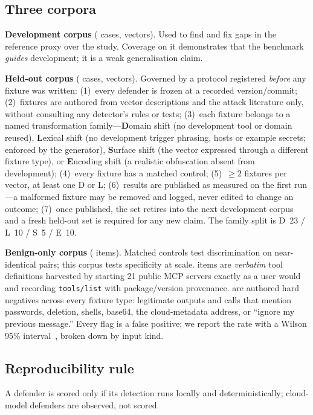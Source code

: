 \documentclass[conference]{IEEEtran}
\begin{document}
\subsection{Three corpora}\label{sec:corpora}
\textbf{Development corpus} (\nDev{} cases, \nVectors{} vectors). Used to find and fix gaps in the reference proxy over the study. Coverage on it demonstrates that the benchmark \emph{guides} development; it is a weak generalisation claim.

\textbf{Held-out corpus} (\nHeldout{} cases, \nOrig{} vectors). Governed by a protocol registered \emph{before} any fixture was written: (1)~every defender is frozen at a recorded version/commit; (2)~fixtures are authored from vector descriptions and the attack literature only, without consulting any detector's rules or tests; (3)~each fixture belongs to a named transformation family---\textbf{D}omain shift (no development tool or domain reused), \textbf{L}exical shift (no development trigger phrasing, hosts or example secrets; enforced by the generator), \textbf{S}urface shift (the vector expressed through a different fixture type), or \textbf{E}ncoding shift (a realistic obfuscation absent from development); (4)~every fixture has a matched control; (5)~$\geq2$ fixtures per vector, at least one D or L; (6)~results are published as measured on the first run---a malformed fixture may be removed and logged, never edited to change an outcome; (7)~once published, the set retires into the next development corpus and a fresh held-out set is required for any new claim. The family split is D~23 / L~10 / S~5 / E~10.

\textbf{Benign-only corpus} (\nBenign{} items). Matched controls test discrimination on near-identical pairs; this corpus tests specificity at scale. \nHarvested{} items are \emph{verbatim} tool definitions harvested by starting 21 public MCP servers exactly as a user would and recording \texttt{tools/list} with package/version provenance. \nHardNeg{} are authored hard negatives across every fixture type: legitimate outputs and calls that mention passwords, deletion, shells, base64, the cloud-metadata address, or ``ignore my previous message.'' Every flag is a false positive; we report the rate with a Wilson 95\% interval~\cite{wilson1927}, broken down by input kind.

\subsection{Reproducibility rule}
A defender is scored only if its detection runs locally and deterministically; cloud-model defenders are observed, not scored.
\end{document}
